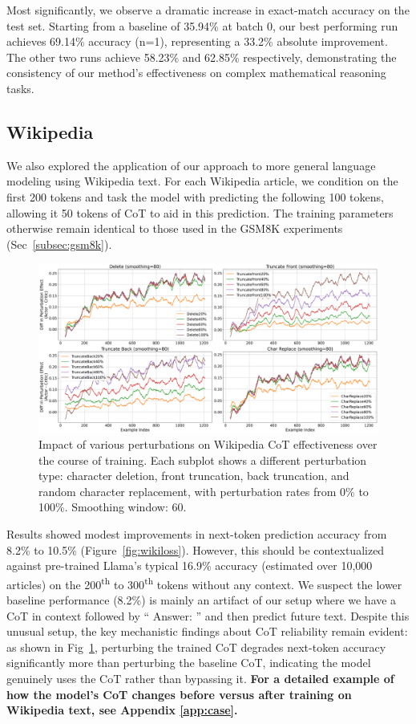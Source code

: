 \documentclass{article}
\theoremstyle{plain}
\theoremstyle{definition}
\theoremstyle{remark}
\begin{document}
Most significantly, we observe a dramatic increase in exact-match accuracy on the test set. Starting from a baseline of 35.94\% at batch 0, our best performing run achieves 69.14\% accuracy (n=1), representing a 33.2\% absolute improvement. The other two runs achieve 58.23\% and 62.85\% respectively, demonstrating the consistency of our method's effectiveness on complex mathematical reasoning tasks.

\subsection{Wikipedia}
\label{subsec:wikipedia}

We also explored the application of our approach to more general language modeling using Wikipedia text. For each Wikipedia article, we condition on the first 200 tokens and task the model with predicting the following 100 tokens, allowing it 50 tokens of CoT to aid in this prediction. The training parameters otherwise remain identical to those used in the GSM8K experiments (Sec~\ref{subsec:gsm8k}).

\begin{figure}[ht]
  \centering
  \includegraphics[width=\textwidth]{Figures/combined_perturbation_plot.png}
  \caption{Impact of various perturbations on Wikipedia CoT effectiveness over the course of training. Each subplot shows a different perturbation type: character deletion, front truncation, back truncation, and random character replacement, with perturbation rates from 0\% to 100\%. Smoothing window: 60.}
  \label{fig:perturbation}
\end{figure}


Results showed modest improvements in next-token prediction accuracy from 8.2\% to 10.5\% (Figure~\ref{fig:wikiloss}). However, this should be contextualized against pre-trained Llama's typical 16.9\% accuracy (estimated over 10,000 articles) on the 200\textsuperscript{th} to 300\textsuperscript{th} tokens without any context. We suspect the lower baseline performance (8.2\%) is mainly an artifact of our setup where we have a CoT in context followed by `` Answer: '' and then predict future text. Despite this unusual setup, the key mechanistic findings about CoT reliability remain evident: as shown in Fig~\ref{fig:perturbation}, perturbing the trained CoT degrades next-token accuracy significantly more than perturbing the baseline CoT, indicating the model genuinely uses the CoT rather than bypassing it.
\textbf{For a detailed example of how the model's CoT changes before versus after training on Wikipedia text, see Appendix \ref{app:case}.}
\end{document}
